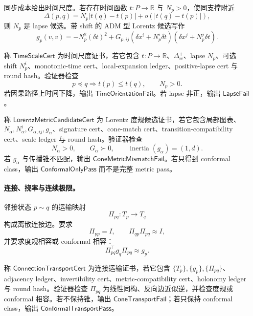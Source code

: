 同步成本给出时间尺度。若存在时间函数 \(t:P\to\mathbb R\) 与 \(N_p>0\)，使同支撑附近
\[
\Delta(p,q)=N_p|t(q)-t(p)|+o(|t(q)-t(p)|),
\]
则 \(N_p\) 是 lapse 候选。带 shift 的 ADM 型 Lorentz 候选写作
\[
\boxed{
g_p(v,v)=
-N_p^2(\delta t)^2
+
G_{p,ij}(\delta x^i+N_p^i\delta t)(\delta x^j+N_p^j\delta t).
}
\]

\begin{definition}[时间尺度证书]\label{def:typed-address-biaxial-completion-time-scale-cert}
称 \(\mathsf{TimeScaleCert}\) 为时间尺度证书，若它包含 \(t:P\to\mathbb R\)、\(\Delta_w^+\)、lapse \(N_p\)、可选 shift \(N_p^i\)、monotonic-time cert、local-expansion ledger、positive-lapse cert 与 round hash。验证器检查
\[
p\preceq q\Longrightarrow t(p)\le t(q),
\qquad
N_p>0.
\]
若因果路径上时间下降，输出 \(\mathsf{TimeOrientationFail}\)。若 lapse 非正，输出 \(\mathsf{LapseFail}\)。
\end{definition}

\begin{definition}\label{def:typed-address-biaxial-completion-lorentz-metric-candidate-cert}
称 \(\mathsf{LorentzMetricCandidateCert}\) 为 Lorentz 度规候选证书，若它包含局部图表、\(N_\alpha,N_\alpha^i,G_{\alpha,ij},g_\alpha\)、signature cert、cone-match cert、transition-compatibility cert、scale ledger 与 round hash。验证器检查
\[
N_\alpha>0,
\qquad
G_\alpha\succ0,
\qquad
\operatorname{inertia}(g_\alpha)=(1,d).
\]
若 \(g_\alpha\) 与传播锥不匹配，输出 \(\mathsf{ConeMetricMismatchFail}\)。若只得到 conformal class，输出 \(\mathsf{ConformalOnlyPass}\) 而不是完整 metric pass。
\end{definition}

\paragraph{连接、挠率与连续极限。}
邻接状态 \(p\sim q\) 的运输映射
\[
\Pi_{pq}:T_p\to T_q
\]
构成离散连接边。要求
\[
\Pi_{pp}=I,
\qquad
\Pi_{qp}\Pi_{pq}\approx I,
\]
并要求度规相容或 conformal 相容：
\[
\Pi_{pq}^\top g_q\Pi_{pq}\approx g_p.
\]

\begin{definition}[连接运输证书]\label{def:typed-address-biaxial-completion-connection-transport-cert}
称 \(\mathsf{ConnectionTransportCert}\) 为连接运输证书，若它包含 \(\{T_p\},\{g_p\},\{\Pi_{pq}\}\)、adjacency ledger、invertibility cert、metric-compatibility cert、holonomy ledger 与 round hash。验证器检查 \(\Pi_{pq}\) 为线性同构、反向边近似逆，并检查度规或 conformal 相容。若不保持锥，输出 \(\mathsf{ConeTransportFail}\)；若只保持 conformal class，输出 \(\mathsf{ConformalTransportPass}\)。
\end{definition}

